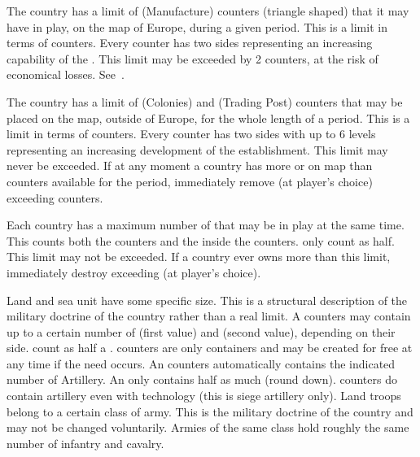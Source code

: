 \aparag[Manufactures] The country has a limit of \MNU (Manufacture) counters
(triangle shaped) that it may have in play, on the map of Europe, during a
given period.
\bparag This is a limit in terms of counters. Every counter has two sides
representing an increasing capability of the \MNU.
\bparag This limit may be exceeded by 2 counters, at the risk of economical
losses. See~.

 The country has a limit of \COL (Colonies)
and \TP (Trading Post) counters that may be placed on the map, outside of
Europe, for the whole length of a period.
\bparag This is a limit in terms of counters. Every counter has two sides with
up to 6 levels representing an increasing development of the establishment.
\bparag This limit may never be exceeded. If at any moment a country has more
\COL or \TP on map than counters available for the period, %
immediately remove (at player's choice) exceeding counters.

\aparag[Fleet] Each country has a maximum number of \ND that may be in play at
the same time.
\bparag This counts both the \ND counters and the \ND inside the \FLEET
counters.
\bparag \NGD only count as half.
\bparag This limit may not be exceeded. If a country ever owns more \ND than
this limit, %
immediately destroy exceeding \ND (at player's choice).

 Land and sea unit have some specific size. This is a
structural description of the military doctrine of the country rather than a
real limit.
\bparag A \FLEET counters may contain up to a certain number of \ND (first
value) and \NTD (second value), depending on their side. \NGD count as half a
\ND. \FLEET counters are only containers and may be created for free at any
time if the need occurs.
\bparag An \ARMY\faceplus counters automatically contains the indicated number
of Artillery. An \ARMY\facemoins only contains half as much (round
down). \ARMY counters do contain artillery even with 
technology (this is siege artillery only).
\bparag Land troops belong to a certain class of army. This is the military
doctrine of the country and may not be changed voluntarily. Armies of the same
class hold roughly the same number of infantry and cavalry.

